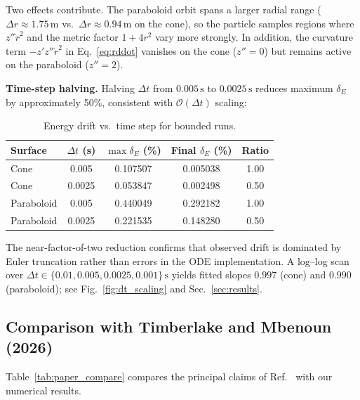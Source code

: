 \documentclass[11pt,letterpaper]{article}
\newcommand{\parhead}[1]{\par\medskip\noindent\textbf{#1}\ignorespaces}
\begin{document}
Two effects contribute. The paraboloid orbit spans a larger radial range ($\Delta r\approx 1.75\,\mathrm{m}$ vs.\ $\Delta r\approx 0.94\,\mathrm{m}$ on the cone), so the particle samples regions where $z''\dot{r}^2$ and the metric factor $1+4r^2$ vary more strongly. In addition, the curvature term $-z'z''\dot{r}^2$ in Eq.~\eqref{eq:rddot} vanishes on the cone ($z''=0$) but remains active on the paraboloid ($z''=2$).

\parhead{Time-step halving.}
Halving $\Delta t$ from $0.005\,\mathrm{s}$ to $0.0025\,\mathrm{s}$ reduces maximum $\delta_E$ by approximately 50\%, consistent with $\mathcal{O}(\Delta t)$ scaling:

\begin{table}[htbp]
    \centering
    \caption{Energy drift vs.\ time step for bounded runs.}
    \label{tab:dt_halving}
    \begin{tabular}{l
        S[table-format=1.4]
        S[table-format=2.6]
        S[table-format=2.6]
        S[table-format=1.2]}
        \toprule
        {Surface} & {$\Delta t$ (s)} & {$\max\delta_E$ (\%)} & {Final $\delta_E$ (\%)} & {Ratio} \\
        \midrule
        Cone & 0.005 & 0.107507 & 0.005038 & 1.00 \\
        Cone & 0.0025 & 0.053847 & 0.002498 & 0.50 \\
        Paraboloid & 0.005 & 0.440049 & 0.292182 & 1.00 \\
        Paraboloid & 0.0025 & 0.221535 & 0.148280 & 0.50 \\
        \bottomrule
    \end{tabular}
\end{table}

The near-factor-of-two reduction confirms that observed drift is dominated by Euler truncation rather than errors in the ODE implementation. A log--log scan over $\Delta t\in\{0.01,0.005,0.0025,0.001\}\,\mathrm{s}$ yields fitted slopes $0.997$ (cone) and $0.990$ (paraboloid); see Fig.~\ref{fig:dt_scaling} and Sec.~\ref{sec:results}.

\subsection{Comparison with Timberlake and Mbenoun (2026)}
\label{sec:paper_compare}

Table~\ref{tab:paper_compare} compares the principal claims of Ref.~\cite{ajp2026} with our numerical results.
\end{document}

